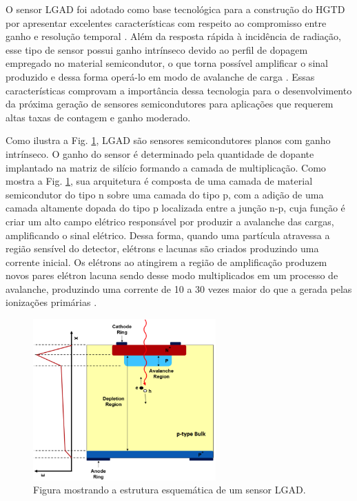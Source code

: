 O sensor LGAD foi adotado como base tecnológica para a construção do HGTD por apresentar excelentes características com respeito ao compromisso entre ganho e resolução temporal \cite{tdr,JIN_LGAD,NIMA_LGAD,NIMA_LGAD_I,NIMA_LGAD_II,NIMA_LGAD_III}. Além da resposta rápida à incidência de radiação, esse tipo de sensor possui ganho intrínseco devido ao perfil de dopagem empregado no material semicondutor, o que torna possível amplificar o sinal produzido e dessa forma operá-lo em modo de avalanche de carga \cite{JIN_LGAD,NIMA_LGAD,NIMA_LGAD_I,NIMA_LGAD_II,NIMA_LGAD_III}. Essas características comprovam a importância dessa tecnologia para o desenvolvimento da próxima geração de sensores semicondutores para aplicações que requerem altas taxas de contagem e ganho moderado.
\thispagestyle{plain}

Como ilustra a Fig. \ref{lgad}, LGAD são sensores semicondutores planos com ganho intrínseco. O ganho do sensor é determinado pela quantidade de dopante implantado na matriz de silício formando a camada de multiplicação. Como mostra a Fig. \ref{lgad}, sua arquitetura é composta de uma camada de material semicondutor do tipo n sobre uma camada do tipo p, com a adição de uma camada altamente dopada do tipo p localizada entre a junção n-p, cuja função é criar um alto campo elétrico responsável por produzir a avalanche das cargas, amplificando o sinal elétrico. Dessa forma, quando uma partícula atravessa a região sensível do detector, elétrons e lacunas são criados produzindo uma corrente inicial. Os elétrons ao atingirem a região de amplificação produzem novos pares elétron lacuna sendo desse modo multiplicados em um processo de avalanche, produzindo uma corrente de 10 a 30 vezes maior do que a gerada pelas ionizações primárias \cite{JIN_LGAD,NIMA_LGAD_III}. 

\begin{figure}
    \centering
    \includegraphics[width=7.0cm]{assets/lgad.png}
    \caption{Figura mostrando a estrutura esquemática de um sensor LGAD.}
    \label{lgad}
\end{figure}
\thispagestyle{plain}

